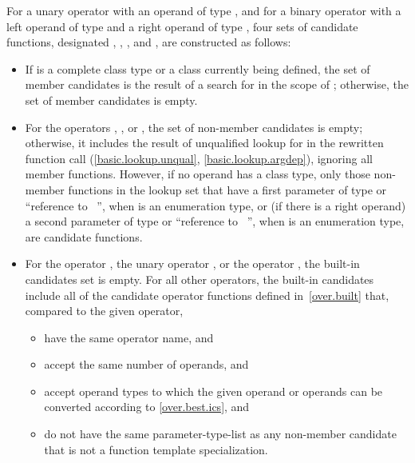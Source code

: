\pnum
For a unary operator 
with an operand of type  ,
and for a binary operator 
with a left operand of type  
and a right operand of type  ,
four sets of candidate functions, designated
,
,
,
and
,
are constructed as follows:
\begin{itemize}
\item
If  is a complete class type or a class currently being defined,
the set of member candidates is the result of a search for
 in the scope of ;
otherwise, the set of member candidates is empty.
\item
For the operators \tcode{=}, \tcode{[]}, or \tcode{->},
the set of non-member candidates is empty;
otherwise, it includes the result of unqualified lookup for
in the rewritten function call
(\ref{basic.lookup.unqual}, \ref{basic.lookup.argdep}),
ignoring all member functions.
However, if no operand has a class type, only those non-member
functions in the lookup set that have a first parameter of type
or ``reference to \cv{}~'',
when
is an enumeration type,
or (if there is a right operand) a second parameter of type
or ``reference to \cv{}~'',
when
is an enumeration type,
are candidate functions.
\item
For the operator
\tcode{,},
the unary operator
\tcode{\&},
or the operator
\tcode{->},
the built-in candidates set is empty.
For all other operators, the built-in candidates include all
of the candidate operator functions defined in~\ref{over.built} that,
compared to the given operator,
\begin{itemize}
\item
have the same operator name, and
\item
accept the same number of operands, and
\item
accept operand types to which the given operand or
operands can be converted according to \ref{over.best.ics}, and
\item
do not have the same parameter-type-list as any non-member candidate
that is not a function template specialization.
\end{itemize}


\end{itemize}
